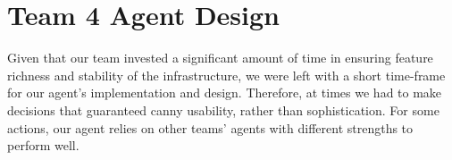 



\chapter{Team 4 Agent Design}   \label{chap:team4}
Given that our team invested a significant amount of time in ensuring feature richness and stability of the infrastructure, we were left with a short time-frame for our agent's implementation and design. Therefore, at times we had to make decisions that guaranteed canny usability, rather than sophistication. For some actions, our agent relies on other teams' agents with different strengths to perform well. 

